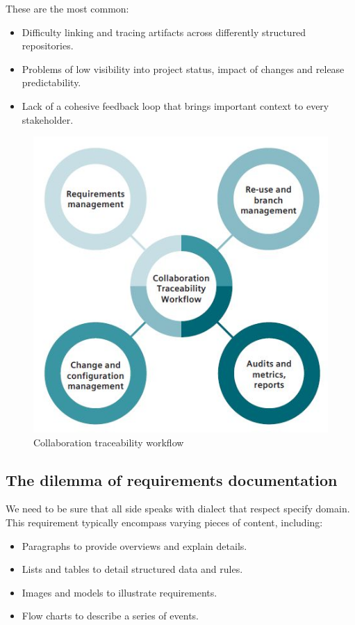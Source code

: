\documentclass[thesis=M,english]{FITthesis}[2012/06/26]
\begin{document}
These are the most common:
\begin{itemize}[nosep]
	\item Difficulty linking and tracing artifacts across differently
	structured repositories.
	\item Problems of low visibility into project status, impact of
	changes and release predictability.
	\item Lack of a cohesive feedback loop that brings important
	context to every stakeholder.
\end{itemize}

\begin{figure}[h!]\centering
	\includegraphics[width=1\textwidth]{pictures/collaboration_workflow}
	\caption{Collaboration traceability workflow \cite{polarion_alm}}\label{fig:collaboration_workflow}
\end{figure}

\subsection{The dilemma of requirements documentation}

We need to be sure that all side speaks with dialect that respect specify domain. This requirement typically encompass varying pieces of content, including:
\begin{itemize}[nosep]
	\item Paragraphs to provide overviews and explain details.
	\item Lists and tables to detail structured data and rules.
	\item Images and models to illustrate requirements.
	\item Flow charts to describe a series of events.
\end{itemize}
\end{document}
